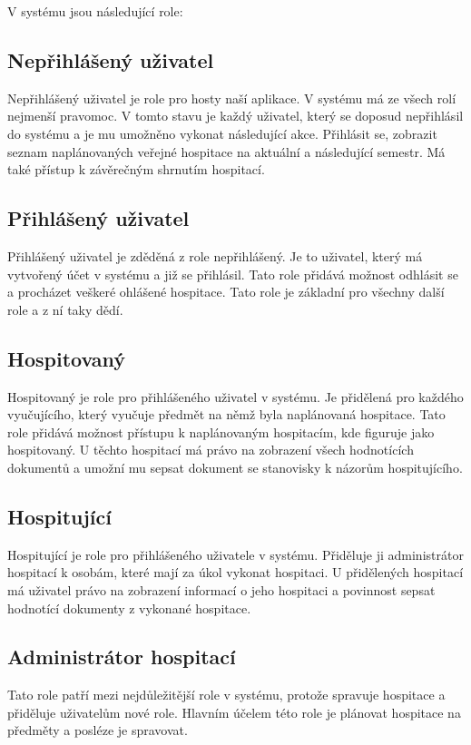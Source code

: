 V systému jsou následující role:

\subsection{Nepřihlášený uživatel}
Nepřihlášený uživatel je role pro hosty naší aplikace. V systému má ze všech rolí nejmenší pravomoc. V tomto stavu je každý uživatel, který se doposud nepřihlásil do systému a je mu umožněno vykonat následující akce. Přihlásit se, zobrazit seznam naplánovaných veřejné hospitace na aktuální a následující semestr. Má také přístup k závěrečným shrnutím hospitací.

\subsection{Přihlášený uživatel}
Přihlášený uživatel je zděděná z role nepřihlášený. Je to uživatel, který má vytvořený účet v systému a již se přihlásil. Tato role přidává možnost odhlásit se a procházet veškeré ohlášené hospitace. Tato role je základní pro všechny další role a z ní taky dědí.

\subsection{Hospitovaný}
Hospitovaný je role pro přihlášeného uživatel v systému. Je přidělená pro každého vyučujícího, který vyučuje předmět na němž byla naplánovaná hospitace. Tato role přidává možnost přístupu k naplánovaným hospitacím, kde figuruje jako hospitovaný. U těchto hospitací má právo na zobrazení všech hodnotících dokumentů a umožní mu sepsat dokument se stanovisky k názorům hospitujícího.

\subsection{Hospitující}
Hospitující je role pro přihlášeného uživatele v systému. Přiděluje ji administrátor hospitací k osobám, které mají za úkol vykonat hospitaci. U přidělených hospitací má uživatel právo na zobrazení informací o jeho hospitaci a povinnost sepsat hodnotící dokumenty z vykonané hospitace.

\subsection{Administrátor hospitací}
Tato role patří mezi nejdůležitější role v systému, protože spravuje hospitace a přiděluje uživatelům nové role. Hlavním účelem této role je plánovat hospitace na předměty a posléze je spravovat.   

